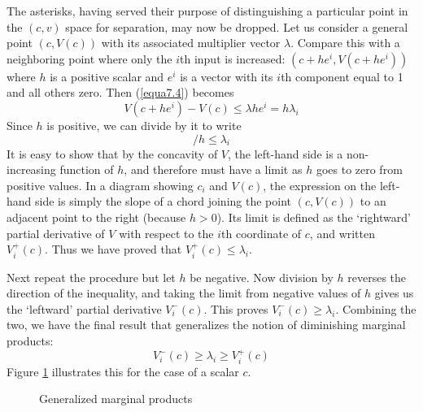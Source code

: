 The asterisks, having served their purpose of distinguishing a particular point in the $(c,v)$ space for separation, may now be dropped. Let us consider a general point $(c, V(c))$ with its associated multiplier vector $\lambda$. Compare this with a neighboring point where only the $i$th input is increased: $(c+he^i, V(c+he^i))$ where $h$ is a positive scalar and $e^i$ is a vector with its $i$th component equal to 1 and all others zero. Then (\ref{equa7.4}) becomes
\begin{equation*}
V(c+he^i) - V(c) \leq \lambda h e^i = h \lambda_i
\end{equation*}
Since $h$ is positive, we can divide by it to write
\begin{equation*}
  [V(c+he^i ) -V(c)] /h \leq \lambda_i
\end{equation*}
It is easy to show that by the concavity of $V$, the left-hand side is a non-increasing function of $h$, and therefore must have a limit as $h$ goes to zero from positive values. In a diagram showing $c_i$ and $V(c)$, the expression on the left-hand side is simply the slope of a chord joining the point $(c, V(c))$ to an adjacent point to the right (because $h>0$). Its limit is defined as the `rightward' partial derivative of $V$ with respect to the $i$th coordinate of $c$, and written $V_i^+(c)$. Thus we have proved that $V_i^+(c) \leq \lambda_i$.

Next repeat the procedure but let $h$ be negative. Now division by $h$ reverses the direction of the inequality, and taking the limit from negative values of $h$ gives us the `leftward' partial derivative $V_i^-(c)$. This proves $V_i^-(c) \geq \lambda_i$. Combining the two, we have the final result that generalizes the notion of diminishing marginal products:
\begin{equation} \label{equa7.5}
V_i^-(c) \geq \lambda_i \geq V_i^+(c)
\end{equation}
Figure \ref{Fig7.3} illustrates this for the case of a scalar $c$.
\begin{figure}[!htb] %
\centering %
\caption{Generalized marginal products} %
\label{Fig7.3} %
\end{figure}

